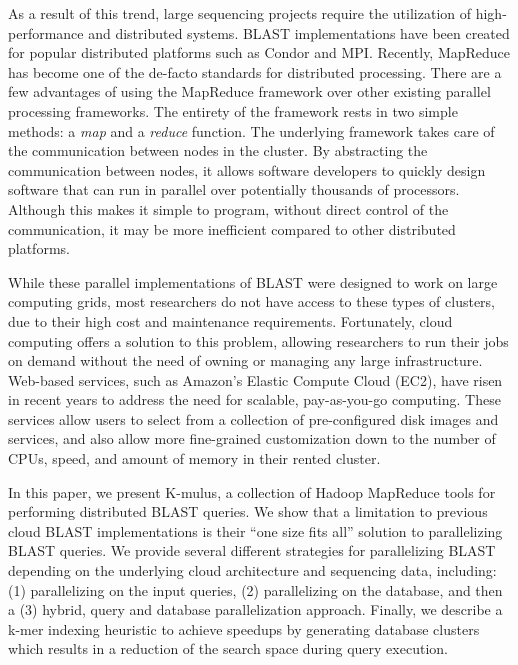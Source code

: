 \documentclass[12pt,\mydriver]{thesis}
\begin{document}
As a result of this trend, large sequencing projects require the utilization of high-performance and distributed systems.
BLAST implementations have been created for popular distributed platforms such as Condor\cite{condor-hunter} and MPI\cite{darling2003design,dongarra1993proposal}.
Recently, MapReduce\cite{dean2008mapreduce} has become one of the de-facto standards for distributed processing.
There are a few advantages of using the MapReduce framework over other existing parallel processing frameworks. The entirety of the framework rests in two simple methods: a \emph{map} and a \emph{reduce} function.
The underlying framework takes care of the communication between nodes in the cluster.
By abstracting the communication between nodes, it allows software developers to quickly design software that can run in parallel over potentially thousands of processors.
Although this makes it simple to program, without direct control of the communication, it may be more inefficient compared to other distributed platforms.



While these parallel implementations of BLAST were designed to work on large computing grids, most researchers do not have access to these types of clusters, due to their high cost and maintenance requirements.
Fortunately, cloud computing offers a solution to this problem, allowing researchers to run their jobs on demand without the need of owning or managing any large infrastructure.
Web-based services, such as Amazon’s Elastic Compute Cloud (EC2)\cite{inc_amazon_2008}, have risen in recent years to address the need for scalable, pay-as-you-go computing.
These services allow users to select from a collection of pre-configured disk images and services, and also allow more fine-grained customization down to the number of CPUs, speed, and amount of memory in their rented cluster.

In this paper, we present K-mulus, a collection of Hadoop MapReduce tools for performing distributed BLAST queries.
We show that a limitation to previous cloud BLAST implementations is their ``one size fits all'' solution to parallelizing BLAST queries.
We provide several different strategies for parallelizing BLAST depending on the underlying cloud architecture and sequencing data, including: (1) parallelizing on the input queries, (2) parallelizing on the database, and then a (3) hybrid, query and database parallelization approach.
Finally, we describe a k-mer indexing heuristic to achieve speedups by generating database clusters which results in a reduction of the search space during query execution.
\end{document}
